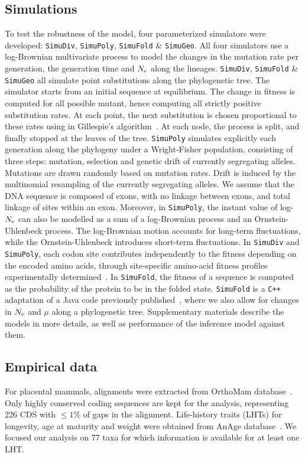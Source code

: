 \documentclass{article}
\begin{document}
\subsection{Simulations}
\label{sec:Simulation}
To test the robustness of the model, four parameterized simulators were developed: \texttt{SimuDiv}, \texttt{SimuPoly}, \texttt{SimuFold} \& \texttt{SimuGeo}.
All four simulators use a log-Brownian multivariate process to model the changes in the mutation rate per generation, the generation time and $N_{\text{e}}$ along the lineages.
\texttt{SimuDiv}, \texttt{SimuFold} \& \texttt{SimuGeo} all simulate point substitutions along the phylogenetic tree.
The simulator starts from an initial sequence at equilibrium.
The change in fitness is computed for all possible mutant, hence computing all strictly positive {substitution} rates.
At each point, the next {substitution} is chosen proportional to these rates using in Gillespie's algorithm~\citep{Gillespie1977}.
At each node, the process is split, and finally stopped at the leaves of the tree.
\texttt{SimuPoly} simulates explicitly each generation along the phylogeny under a Wright-Fisher population, consisting of three steps: mutation, selection and {genetic drift} of currently segregating alleles.
Mutations are drawn randomly based on mutation rates.
Drift is induced by the multinomial resampling of the currently segregating alleles.
We assume that the {DNA} sequence is composed of exons, with no linkage between exons, and total linkage of sites within an exon.
Moreover, in \texttt{SimuPoly}, the instant value of log-$N_{\text{e}}$ can also be modelled as a sum of a log-Brownian process and an Ornstein-Uhlenbeck process.
The log-Brownian motion accounts for long-term fluctuations, while the Ornstein-Uhlenbeck introduces short-term fluctuations.
In \texttt{SimuDiv} and \texttt{SimuPoly}, each {codon} site contributes independently to the fitness depending on the encoded amino acids, through site-specific amino-acid fitness profiles experimentally determined~\citep{Bloom2017}.
In \texttt{SimuFold}, the fitness of a sequence is computed as the probability of the protein to be in the folded state.
\texttt{SimuFold} is a \texttt{C++} adaptation of a Java code previously published~\citep{Goldstein2016, Goldstein2017}, where we also allow for changes in $N_{\text{e}}$ and $\mu$ along a phylogenetic tree.
Supplementary materials describe the models in more details, as well as performance of the inference model against them.

\subsection{Empirical data}
For placental mammals, alignments were extracted from OrthoMam database~\citep{Ranwez2007,Scornavacca2019}.
Only highly conserved coding sequences are kept for the analysis, representing 226 {CDS} with $\leq 1\%$ of gaps in the alignment.
Life-history traits ({LHT}s) for longevity, age at maturity and weight were obtained from AnAge database~\citep{DEMAGALHAES2009,Tacutu2012}.
We focused our analysis on 77 taxa for which information is available for at least one {LHT}.
\end{document}
